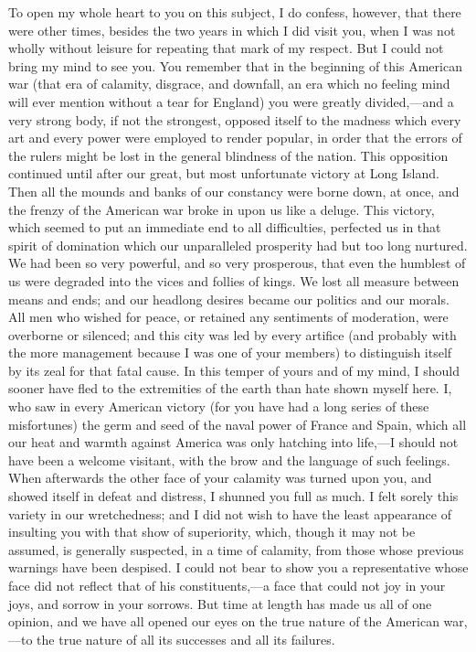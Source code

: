 To open my whole heart to you on this subject, I do confess, however, that there were other times, besides the two years in which I did visit you, when I was not wholly without leisure for repeating that mark of my respect. But I could not bring my mind to see you. You remember that in the beginning of this American war (that era of calamity, disgrace, and downfall, an era which no feeling mind will ever mention without a tear for England) you were greatly divided,—and a very strong body, if not the strongest, opposed itself to the madness which every art and every power were employed to render popular, in order that the errors of the rulers might be lost in the general blindness of the nation. This opposition continued until after our great, but most unfortunate victory at Long Island. Then all the mounds and banks of our constancy were borne down, at once, and the frenzy of the American war broke in upon us like a deluge. This victory, which seemed to put an immediate end to all difficulties, perfected us in that spirit of domination which our unparalleled prosperity had but too long nurtured. We had been so very powerful, and so very prosperous, that even the humblest of us were degraded into the vices and follies of kings. We lost all measure between means and ends; and our headlong desires became our politics and our morals. All men who wished for peace, or retained any sentiments of moderation, were overborne or silenced; and this city was led by every artifice (and probably with the more management because I was one of your members) to distinguish itself by its zeal for that fatal cause. In this temper of yours and of my mind, I should sooner have fled to the extremities of the earth than hate shown myself here. I, who saw in every American victory (for you have had a long series of these misfortunes) the germ and seed of the naval power of France and Spain, which all our heat and warmth against America was only hatching into life,—I should not have been a welcome visitant, with the brow and the language of such feelings. When afterwards the other face of your calamity was turned upon you, and showed itself in defeat and distress, I shunned you full as much. I felt sorely this variety in our wretchedness; and I did not wish to have the least appearance of insulting you with that show of superiority, which, though it may not be assumed, is generally suspected, in a time of calamity, from those whose previous warnings have been despised. I could not bear to show you a representative whose face did not reflect that of his constituents,—a face that could not joy in your joys, and sorrow in your sorrows. But time at length has made us all of one opinion, and we have all opened our eyes on the true nature of the American war,—to the true nature of all its successes and all its failures.

